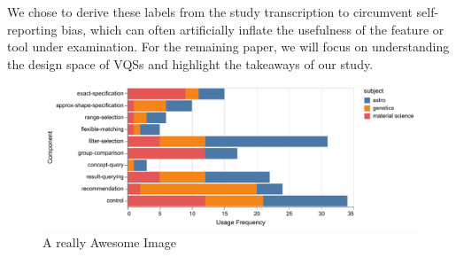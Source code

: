 We chose to derive these labels from the study transcription to circumvent self-reporting bias, which can often artificially inflate the usefulness of the feature or tool under examination. For the remaining paper, we will focus on understanding the design space of VQSs and highlight the takeaways of our study.%
\begin{figure}[h!]
  \includegraphics[width=\linewidth]{figures/usagefreqbysubject.pdf}
  \caption{A really Awesome Image}\label{fig:usagefreqbysubject}
\end{figure}
